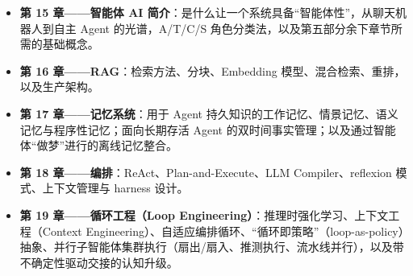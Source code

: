 \documentclass[11pt,a4paper,openany]{book}
\begin{document}
\begin{itemize}
  \item \textbf{第 15 章——智能体 AI 简介}：是什么让一个系统具备“智能体性”，从聊天机器人到自主 Agent 的光谱，A/T/C/S 角色分类法，以及第五部分余下章节所需的基础概念。
  \item \textbf{第 16 章——RAG}：检索方法、分块、Embedding 模型、混合检索、重排，以及生产架构。
  \item \textbf{第 17 章——记忆系统}：用于 Agent 持久知识的工作记忆、情景记忆、语义记忆与程序性记忆；面向长期存活 Agent 的双时间事实管理；以及通过智能体“做梦”进行的离线记忆整合。
  \item \textbf{第 18 章——编排}：ReAct、Plan-and-Execute、LLM Compiler、reflexion 模式、上下文管理与 harness 设计。
  \item \textbf{第 19 章——循环工程（Loop Engineering）}：推理时强化学习、上下文工程（Context Engineering）、自适应编排循环、“循环即策略”（loop-as-policy）抽象、并行子智能体集群执行（扇出/扇入、推测执行、流水线并行），以及带不确定性驱动交接的认知升级。

\end{itemize}
\end{document}
